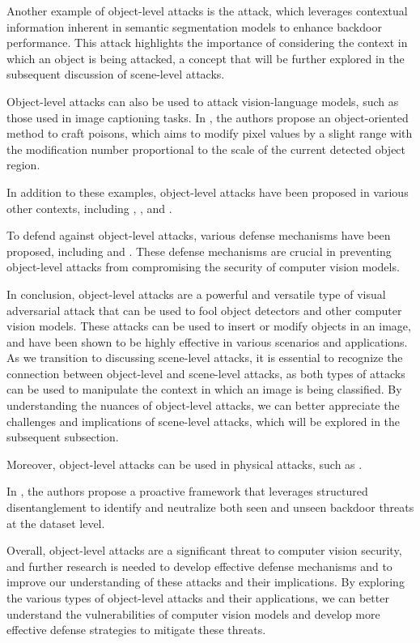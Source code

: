 \documentclass[11pt]{article}
\begin{document}
Another example of object-level attacks is the \cite{ref70} attack, which leverages contextual information inherent in semantic segmentation models to enhance backdoor performance. This attack highlights the importance of considering the context in which an object is being attacked, a concept that will be further explored in the subsequent discussion of scene-level attacks.

Object-level attacks can also be used to attack vision-language models, such as those used in image captioning tasks. In \cite{ref71}, the authors propose an object-oriented method to craft poisons, which aims to modify pixel values by a slight range with the modification number proportional to the scale of the current detected object region.

In addition to these examples, object-level attacks have been proposed in various other contexts, including \cite{ref72}, \cite{ref73}, and \cite{ref74}.

To defend against object-level attacks, various defense mechanisms have been proposed, including \cite{ref64} and \cite{ref75}. These defense mechanisms are crucial in preventing object-level attacks from compromising the security of computer vision models.

In conclusion, object-level attacks are a powerful and versatile type of visual adversarial attack that can be used to fool object detectors and other computer vision models. These attacks can be used to insert or modify objects in an image, and have been shown to be highly effective in various scenarios and applications. As we transition to discussing scene-level attacks, it is essential to recognize the connection between object-level and scene-level attacks, as both types of attacks can be used to manipulate the context in which an image is being classified. By understanding the nuances of object-level attacks, we can better appreciate the challenges and implications of scene-level attacks, which will be explored in the subsequent subsection.

Moreover, object-level attacks can be used in physical attacks, such as \cite{ref76}.

In \cite{ref77}, the authors propose a proactive framework that leverages structured disentanglement to identify and neutralize both seen and unseen backdoor threats at the dataset level.

Overall, object-level attacks are a significant threat to computer vision security, and further research is needed to develop effective defense mechanisms and to improve our understanding of these attacks and their implications. By exploring the various types of object-level attacks and their applications, we can better understand the vulnerabilities of computer vision models and develop more effective defense strategies to mitigate these threats.
\end{document}
